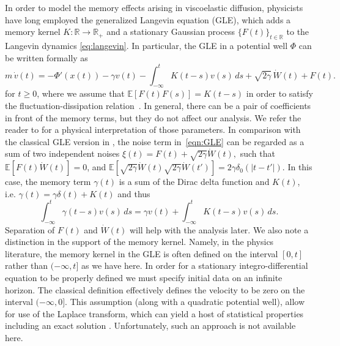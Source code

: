 \documentclass[11pt]{amsart}
\theoremstyle{definition}
\newcommand{\rbb}{\mathbb{R}}
\newcommand{\E}[1]{\mathbb{E}\left[#1\right]}
\theoremstyle{definition}
\theoremstyle{plain}
\numberwithin{equation}{section}
\begin{document}
In order to model the memory effects arising in viscoelastic diffusion, physicists have long employed the generalized Langevin equation (GLE), which adds a memory kernel $K: \rbb \to \rbb_+$ and a stationary Gaussian process $\{F(t)\}_{t \in \rbb}$ to the Langevin dynamics \eqref{eq:langevin}. In particular, the GLE in a potential well $\Phi$ can be written formally as
\begin{equation}\label{eqn:GLE}
m\, \dot{v}(t)=- \Phi'(x(t)) -\gamma v(t) - \int_{-\infty}^t K(t-s)v(s)\, ds + \sqrt{2\gamma} \, \dot{W}(t) + F(t).
\end{equation}
for $t \geq 0$, where we assume that $\E{F(t) F(s)} = K(t-s)$ in order to satisfy the fluctuation-dissipation relation~\cite{kubo1966fluctuation,hohenegger2017equipartition,hohenegger2018reconstructing}. In general, there can be a pair of coefficients in front of the memory terms, but they do not affect our analysis. We refer the reader to \cite{hohenegger2017fluid} for a physical interpretation of those parameters. In comparison with the classical GLE version in \cite{kubo1966fluctuation}, the noise term in~\eqref{eqn:GLE} can be regarded as a sum of two independent noises $\xi(t)=F(t)+\sqrt{2\gamma}\dot{W}(t),$ such that $\mathbb{E}[F(t)\dot{W}(t)]=0$, and $\mathbb{E}[\sqrt{2\gamma}\dot{W}(t) \sqrt{2\gamma}\dot{W}(t')]=2\gamma\delta_0(|t-t'|)$. In this case, the memory term $\gamma(t)$ is a sum of the Dirac delta function and $K(t)$, i.e. $\gamma(t)=\gamma\delta(t)+K(t)$ and thus
$$\int_{-\infty}^t \gamma(t-s)v(s)\, ds=\gamma v(t)+\int_{-\infty}^t K(t-s)v(s)\, ds.$$
Separation of $F(t)$ and $\dot{W}(t)$ will help with the analysis later. We also note a distinction in the support of the memory kernel. Namely, in the physics literature, the memory kernel in the GLE is often defined on the interval $[0,t]$ rather than $(-\infty,t]$ as we have here. In order for a stationary integro-differential equation to be properly defined we must specify initial data on an infinite horizon. The classical definition effectively defines the velocity to be zero on the interval $(-\infty, 0]$. This assumption (along with a quadratic potential well), allow for use of the Laplace transform, which can yield a host of statistical properties including an exact solution \cite{vinales2006anomalous,desposito2008memory}. Unfortunately, such an approach is not available here.
\end{document}
